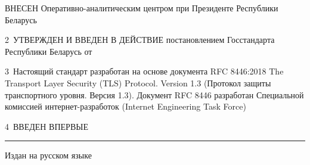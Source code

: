 ВНЕСЕН Оперативно-аналитическим центром при Президенте Республики Беларусь 

2~УТВЕРЖДЕН И ВВЕДЕН В ДЕЙСТВИЕ постановлением Госстандарта Республики 
Беларусь от $\phantom{\text{22 мая 2014 г.}}$~\No~$\phantom{23}$

3~Настоящий стандарт разработан на основе документа RFC 8446:2018 The 
Transport Layer Security (TLS) Protocol. Version 1.3 (Протокол защиты 
транспортного уровня. Версия 1.3). Документ RFC 8446 разработан 
Специальной комиссией интернет-разработок (Internet Engineering Task 
Force)

4~ВВЕДЕН ВПЕРВЫЕ

\vfill
\hrule
\vskip1mm
Издан на русском языке

\pagebreak
